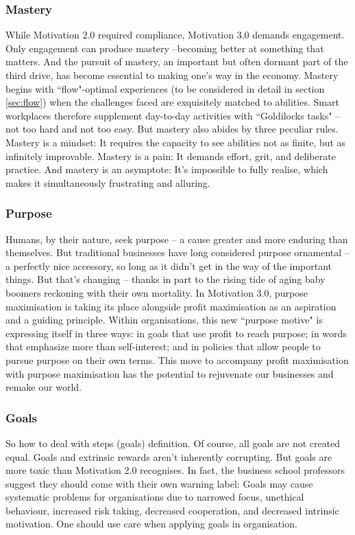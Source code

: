 \subsubsection{Mastery}
While Motivation 2.0 required compliance, Motivation 3.0 demands engagement. Only engagement can produce mastery --becoming better at something that matters. And the pursuit of mastery, an important but often dormant part of the third drive, has become essential to making one’s way in the economy. Mastery begins with ``flow"-optimal experiences (to be considered in detail in section \ref{sec:flow}) when the challenges faced are exquisitely matched to abilities. Smart workplaces therefore supplement day-to-day activities with ``Goldilocks tasks" -- not too hard and not too easy. But mastery also abides by three peculiar rules. Mastery is a mindset: It requires the capacity to see abilities not as finite, but as infinitely improvable. Mastery is a pain: It demands effort, grit, and deliberate practice. And mastery is an asymptote: It’s impossible to fully realise, which makes it simultaneously frustrating and alluring.

\subsubsection{Purpose}
Humans, by their nature, seek purpose -- a cause greater and more enduring than themselves. But traditional businesses have long considered purpose ornamental -- a perfectly nice accessory, so long as it didn’t get in the way of the important things. But that’s changing -- thanks in part to the rising tide of aging baby boomers reckoning with their own mortality. In Motivation 3.0, purpose maximisation is taking its place alongside profit maximisation as an aspiration and a guiding principle. Within organisations, this new ``purpose motive" is expressing itself in three ways: in goals that use profit to reach purpose; in words that emphasize more than self-interest; and in policies that allow people to pursue purpose on their own terms. This move to accompany profit maximisation with purpose maximisation has the potential to rejuvenate our businesses and remake our world.


\subsubsection{Goals}
So how to deal with steps (goals) definition. Of course, all goals are not created equal. Goals and extrinsic rewards aren’t inherently corrupting. But goals are more toxic than Motivation 2.0 recognises. In fact, the business school professors suggest they should come with their own warning label: Goals may cause systematic problems for organisations due to narrowed focus, unethical behaviour, increased risk taking, decreased cooperation, and decreased intrinsic motivation. One should use care when applying goals in organisation.

